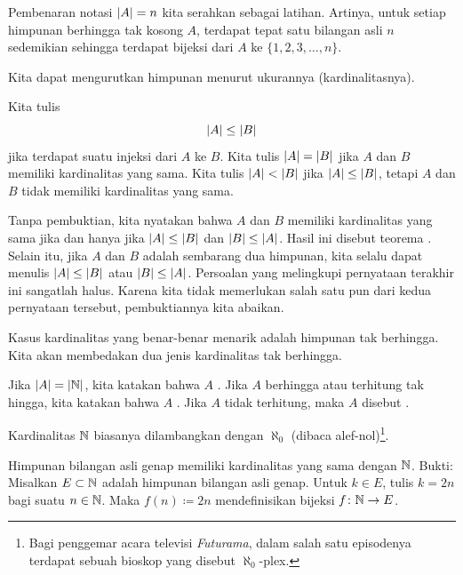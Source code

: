 Pembenaran notasi $\lvert {A} \rvert = n$ kita serahkan sebagai latihan.  Artinya,
untuk setiap himpunan berhingga tak kosong $A$, terdapat tepat satu bilangan asli
$n$ sedemikian sehingga terdapat bijeksi dari $A$ ke $\{ 1,2,3,\ldots,n \}$.

Kita dapat mengurutkan himpunan menurut ukurannya (kardinalitasnya).

\begin{defn} \label{def:comparecards}
Kita tulis
\begin{equation*}
\lvert {A} \rvert \leq \lvert {B} \rvert
\end{equation*}
jika terdapat suatu injeksi dari $A$ ke $B$.  Kita tulis $\lvert {A} \rvert = \lvert {B} \rvert$
jika $A$ dan $B$ memiliki kardinalitas yang sama.  Kita tulis $\lvert {A} \rvert < \lvert {B} \rvert$
jika $\lvert {A} \rvert \leq \lvert {B} \rvert$, tetapi $A$ dan $B$ tidak memiliki kardinalitas yang sama.
\end{defn}

Tanpa pembuktian, kita nyatakan bahwa
$A$ dan $B$ memiliki kardinalitas yang sama jika dan hanya jika
$\lvert {A} \rvert \leq \lvert {B} \rvert$ dan
$\lvert {B} \rvert \leq \lvert {A} \rvert$.  Hasil ini disebut teorema
.
Selain itu, jika $A$ dan $B$ adalah sembarang dua himpunan,
kita selalu dapat menulis $\lvert {A} \rvert \leq \lvert {B} \rvert$ atau
$\lvert {B} \rvert \leq \lvert {A} \rvert$.  Persoalan yang melingkupi
pernyataan terakhir ini sangatlah halus.  Karena kita tidak memerlukan salah satu pun
dari kedua pernyataan tersebut, pembuktiannya kita abaikan.

Kasus kardinalitas yang benar-benar menarik adalah himpunan tak berhingga.
Kita akan membedakan dua jenis kardinalitas tak berhingga.

\begin{defn}
Jika $\lvert {A} \rvert = \lvert {{\mathbb{N}}} \rvert$, kita katakan bahwa $A$
\emph{}.
Jika $A$ berhingga atau terhitung tak hingga, kita katakan bahwa $A$
\emph{}.
Jika $A$ tidak terhitung, maka
$A$ disebut \emph{}.
\end{defn}

Kardinalitas ${\mathbb{N}}$ biasanya dilambangkan dengan
$\aleph_0$ (dibaca alef-nol)\footnote{Bagi penggemar acara televisi
\emph{Futurama}, dalam salah satu episodenya terdapat sebuah bioskop
yang disebut $\aleph_0$-plex.}.

\begin{example}
Himpunan bilangan asli genap memiliki kardinalitas yang sama dengan ${\mathbb{N}}$.  Bukti:
Misalkan $E \subset {\mathbb{N}}$ adalah himpunan bilangan asli genap.
Untuk $k \in E$, tulis $k=2n$ bagi suatu $n \in {\mathbb{N}}$.
Maka $f(n) \coloneqq 2n$ mendefinisikan bijeksi $f \colon {\mathbb{N}} \to E$.
\end{example}

